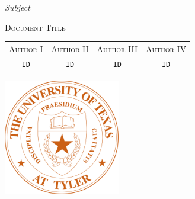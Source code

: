\documentclass[letterpaper,
               extrafontsizes,
               11pt,
               oneside,
               final]{memoir}   %
\newcommand{\thedocumenttitle}{Document Title}
\theoremstyle{plain}                        %
\theoremstyle{definition}
\theoremstyle{remark}
\begin{document}
\setlrmarginsandblock{1in}{1in}{*}          %
\checkandfixthelayout                       %
\titlingpageend{\clearpage}{\clearpage}     %
\begin{titlingpage}
  \begin{center}
  \vspace*{1in}

  {\LARGE\itshape Subject}

  \vspace{0.25in}

  {\Huge\scshape\thedocumenttitle}

  \vspace{0.25in}
  \newcommand{\theoldtabcolsep}{\tabcolsep}
  \setlength{\tabcolsep}{0.25in}

  \begin{tabular}{cccc}
    {\scshape Author I} & {\scshape Author II} & {\scshape Author III} & {\scshape Author IV}\\
    {\verb|ID|} & {\verb|ID|} & {\verb|ID|} & {\verb|ID|}
  \end{tabular}
  \setlength{\tabcolsep}{\theoldtabcolsep}

  \vfill

  \includegraphics[width=2in]{UT_Tyler_Seal_Orange.png}         %
  \vspace{1in}
  \end{center}
\end{titlingpage}
\end{document}
